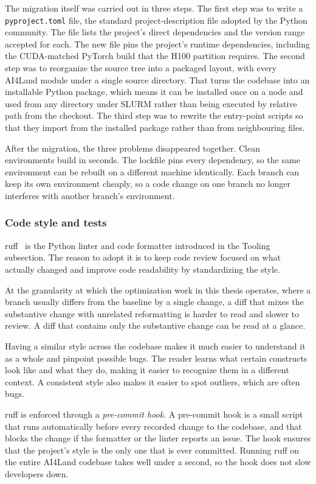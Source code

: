 \documentclass[12pt,a4paper]{article}
\begin{document}
The migration itself was carried out in three steps. The first step was to write a
\texttt{pyproject.toml} file, the standard project-description file adopted by the Python
community. The file lists the project's direct dependencies and the version range accepted for
each. The new file pins the project's runtime dependencies, including the CUDA-matched PyTorch
build that the H100 partition requires. The second step was to reorganize the source tree into a
packaged layout, with every AI4Land module under a single source directory. That turns the
codebase into an installable Python package, which means it can be installed once on a node and
used from any directory under SLURM rather than being executed by relative path from the
checkout. The third step was to rewrite the entry-point scripts so that they import from the
installed package rather than from neighbouring files.

After the migration, the three problems disappeared together. Clean environments build in
seconds. The lockfile pins every dependency, so the same environment can be rebuilt on a
different machine identically. Each branch can keep its own environment cheaply, so a code
change on one branch no longer interferes with another branch's environment.

\subsubsection{Code style and tests}

ruff~\cite{ruff} is the Python linter and code formatter introduced in the Tooling subsection.
The reason to adopt it is to keep code review focused on what actually changed and improve code
readability by standardizing the style.

At the granularity at which the optimization work in this thesis operates, where a branch usually
differs from the baseline by a single change, a diff that mixes the substantive change with
unrelated reformatting is harder to read and slower to review. A diff that contains only the
substantive change can be read at a glance.

Having a similar style across the codebase makes it much easier to understand it as a whole and
pinpoint possible bugs. The reader learns what certain constructs look like and what they do, making
it easier to recognize them in a different context. A consistent style also makes it easier to
spot outliers, which are often bugs.

ruff is enforced through a \emph{pre-commit hook}. A pre-commit hook is a small script that
runs automatically before every recorded change to the codebase, and that blocks the change if
the formatter or the linter reports an issue. The hook ensures that the project's style is the
only one that is ever committed. Running ruff on the entire AI4Land codebase takes well under a
second, so the hook does not slow developers down.
\end{document}
